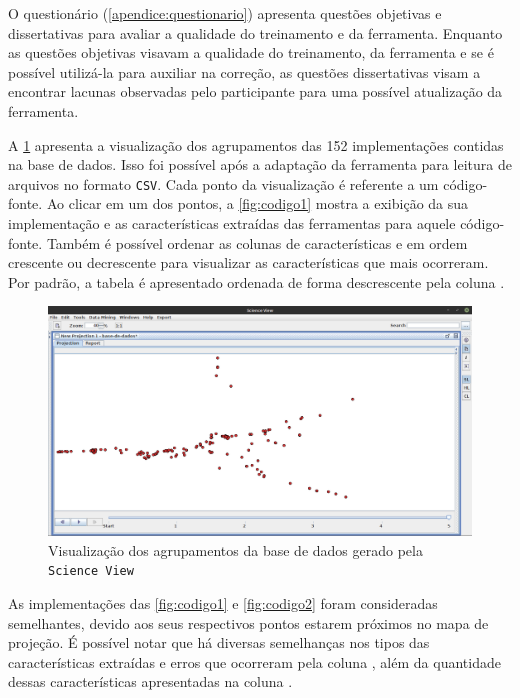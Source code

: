 		O questionário (\cref{apendice:questionario}) apresenta questões objetivas e
		dissertativas para avaliar a qualidade do treinamento e da ferramenta. Enquanto
		as questões objetivas visavam a qualidade do treinamento, da ferramenta e se
		é possível utilizá-la para auxiliar na correção, as questões dissertativas
		visam a encontrar lacunas observadas pelo participante para uma possível 
		atualização da ferramenta.
		
		A \cref{fig:projecaoFinal} apresenta a visualização dos agrupamentos das 152
		implementações contidas na base de dados. Isso foi possível após a adaptação da
		ferramenta para leitura de arquivos no formato \texttt{CSV}. Cada ponto da
		visualização é referente a um código-fonte. Ao clicar em um dos pontos, a
		\cref{fig:codigo1} mostra a exibição da sua implementação e as características
		extraídas das ferramentas para aquele código-fonte. Também é possível ordenar
		as colunas de características  e  em
		ordem  crescente ou decrescente para visualizar as características que mais
		ocorreram. Por padrão, a tabela é apresentado ordenada de forma descrescente
		pela coluna .
	
		\begin{figure}[h]
			\centering
			\includegraphics[width=1\linewidth]{imagem/projecaoFinal} %
			\caption[Visualização dos agrupamentos da base de dados gerado pela \texttt{Science View}]
			{Visualização dos agrupamentos da base de dados gerado pela \texttt{Science View} \cite{Alencar-etal:2012}}
			\label{fig:projecaoFinal}
		\end{figure}
		
		As implementações das \cref{fig:codigo1} e \cref{fig:codigo2} foram consideradas
		semelhantes, devido aos seus respectivos pontos estarem próximos no mapa de
		projeção. É possível notar que há diversas semelhanças nos tipos das características
		extraídas e erros que ocorreram pela coluna , além da quantidade
		dessas características apresentadas na coluna .
		

